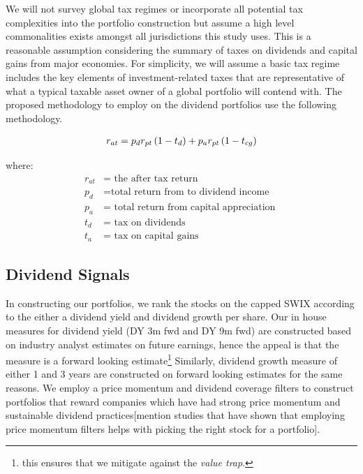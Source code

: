 \documentclass[11pt,preprint, authoryear]{elsarticle}
\numberwithin{equation}{section}
\numberwithin{figure}{section}
\numberwithin{table}{section}
\let\rmarkdownfootnote\footnote%
\def\footnote{\protect\rmarkdownfootnote}
\begin{document}
We will not survey global tax regimes or incorporate all potential tax
complexities into the portfolio construction but assume a high level
commonalities exists amongst all jurisdictions this study uses. This is
a reasonable assumption considering the summary of taxes on dividends
and capital gains from major economies. For simplicity, we will assume a
basic tax regime includes the key elements of investment-related taxes
that are representative of what a typical taxable asset owner of a
global portfolio will contend with. The proposed methodology to employ
on the dividend portfolios use the following methodology.

\begin{align}
r_{a t}=p_d r_{p t}\left(1-t_d\right)+p_a r_{p t}\left(1-t_{c g}\right) \notag
\end{align}

where: \[
\begin{aligned}
r_{at} & =\text { the after tax return} \\
p_{d} & =\text {total return from to dividend income } \\
p_{a} &= \text { total return from capital appreciation } \\
t_{d}&= \text { tax on dividends}\\
t_{a}& = \text { tax on capital gains }
\end{aligned}
\]

\hypertarget{dividend-signals}{%
\subsection*{Dividend Signals}\label{dividend-signals}}

In constructing our portfolios, we rank the stocks on the capped SWIX
according to the either a dividend yield and dividend growth per share.
Our in house measures for dividend yield (DY 3m fwd and DY 9m fwd) are
constructed based on industry analyst estimates on future earnings,
hence the appeal is that the measure is a forward looking
estimate\footnote{ this ensures that we mitigate against the \emph{value
  trap}.} Similarly, dividend growth measure of either 1 and 3 years are
constructed on forward looking estimates for the same reasons. We employ
a price momentum and dividend coverage filters to construct portfolios
that reward companies which have had strong price momentum and
sustainable dividend practices{[}mention studies that have shown that
employing price momentum filters helps with picking the right stock for
a portfolio{]}.
\end{document}

